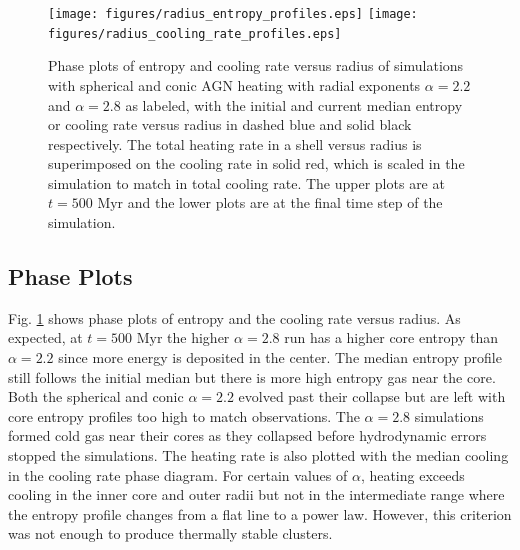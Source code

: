 \documentclass[iop,apjl, twocolappendix]{emulateapj}   %
\def\FG#1{{\textcolor{ForestGreen}{\textbf{\textit{ FG: #1}}}}}
\begin{document}
\begin{figure}
	\begin{center}
    \texttt{[image: figures/radius\_entropy\_profiles.eps]}
		\texttt{[image: figures/radius\_cooling\_rate\_profiles.eps]}
	\end{center}
	\caption{
    \label{fig:phasePlots}
    Phase plots of entropy and cooling rate versus radius of simulations with
    spherical and conic AGN heating with radial exponents $\alpha=2.2$ and
    $\alpha=2.8$ as labeled, with the initial and current median entropy or
    cooling rate versus radius in dashed blue and solid black respectively. The
    total heating rate in a shell versus radius is superimposed on the cooling
    rate in solid red, which is scaled in the simulation to match in total
    cooling rate.  The upper plots are at $t= 500 \text{ Myr}$ and the lower
    plots are at the final time step of the simulation.
  }
\end{figure}

\subsection{Phase Plots}
\label{sec:phase_plots}

Fig. \ref{fig:phasePlots} shows phase plots of entropy and the cooling rate
versus radius. As expected, at $t= 500 \text{ Myr}$ the higher $\alpha=2.8$ run
has a higher core entropy than $\alpha=2.2$ since more energy is deposited in
the center. The median entropy profile still follows the initial median but
there is more high entropy gas near the core. Both the spherical and conic
$\alpha=2.2$ evolved past their collapse but are left with core entropy
profiles too high to match observations. The $\alpha=2.8$ simulations formed
cold gas near their cores as they collapsed before hydrodynamic errors stopped
the simulations.  The heating rate is also plotted with the median cooling in
the cooling rate phase diagram. For certain values of $\alpha$, heating exceeds
cooling in the inner core and outer radii but not in the intermediate range
where the entropy profile changes from a flat line to a power law. 
However, this criterion was not
enough to produce thermally stable clusters.
\end{document}
